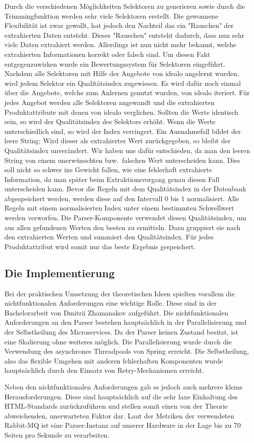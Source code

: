 Durch die verschiedenen Möglichkeiten Selektoren zu generieren sowie durch die Trimmingfunktion werden sehr viele
Selektoren erstellt.
Die gewonnene Flexibilität ist zwar gewollt, hat jedoch den Nachteil das ein "Rauschen" der extrahierten Daten entsteht.
Dieses "Rauschen" entsteht dadurch, dass nun sehr viele Daten extrahiert werden.
Allerdings ist nun nicht mehr bekannt, welche extrahierten Informationen korrekt oder falsch sind.
Um diesen Fakt entgegenzuwirken wurde ein Bewertungssystem für Selektoren eingeführt.
Nachdem alle Selektoren mit Hilfe der Angebote von idealo angelernt wurden, wird jedem Selektor ein Qualitätsindex
zugewiesen.
Es wird dafür noch einmal über die Angebote, welche zum Anlernen genutzt wurden, von idealo iteriert.
Für jedes Angebot werden alle Selektoren angewandt und die extrahierten Produktattribute mit denen von idealo
verglichen.
Sollten die Werte identisch sein, so wird der Qualitätsindex des Selektors erhöht.
Wenn die Werte unterschiedlich sind, so wird der Index verringert.
Ein Ausnahmefall bildet der leere String: Wird dieser als extrahierter Wert zurückgegeben, so bleibt der
Qualitätsindex unverändert.
Wir haben uns dafür entschieden, da man den leeren String von einem unerwünschten bzw.\  falschen Wert unterscheiden
kann.
Dies soll nicht so schwer ins Gewicht fallen, wie eine fehlerhaft extrahierte Information, da man später beim
Extraktionsvorgang genau diesen Fall unterscheiden kann.
Bevor die Regeln mit dem Qualitätsindex in der Datenbank abgespeichert werden, werden diese auf den
Intervall 0 bis 1 normalisiert.
Alle Regeln mit einem normalisierten Index unter einem bestimmten Schwellwert werden verworfen.
Die Parser-Komponente verwendet diesen Qualitätsindex, um aus allen gefundenen Werten den besten zu ermitteln.
Dazu gruppiert sie nach den extrahierten Werten und summiert den Qualitätsindex.
Für jedes Produktattribut wird somit nur das beste Ergebnis gespeichert.

\subsection{Die Implementierung}
\label{subsec:implementierung}

Bei der praktischen Umsetzung der theoretischen Ideen spielten vorallem die nichtfunktionalen Anforderungen eine
wichtige Rolle.
Diese sind in der Bachelorarbeit von Dmitrii Zhamanakov aufgeführt.
Die nichtfunktionalen Anforderungen an den Parser bestehen hauptsächlich in der Parallelisierung und der
Selbstheilung des Microservices.
Da der Parser keinen Zustand besitzt, ist eine Skalierung ohne weiteres möglich.
Die Parallelisierung wurde durch die Verwendung des asynchrones Threadpools von Spring erreicht.
Die Selbstheilung, also das flexible Umgehen mit anderen fehlerhaften Komponenten wurde hauptsächlich durch den
Einsatz von Retry-Mechanismen erreicht.

Neben den nichtfunktionalen Anforderungen gab es jedoch auch mehrere kleine Herausforderungen.
Diese sind hauptsächlich auf die sehr laxe Einhaltung des HTML-Standards zurückzuführen und stellen somit einen von
der Theorie abweichenden, unerwarteten Faktor dar.
Laut der Metriken der verwendeten Rabbit-MQ ist eine Parser-Instanz auf unserer Hardware in der Lage bis zu 70 Seiten
pro Sekunde zu verarbeiten.
